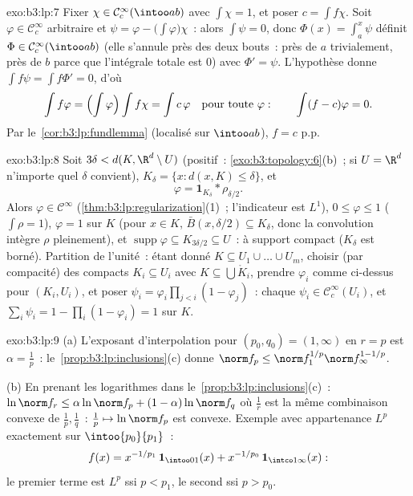 \begin{solution}{exo:b3:lp:7}
Fixer $\chi \in \mathcal C_c^\infty(\intoo ab)$ avec
$\int\chi = 1$, et poser $c = \int f\chi$. Soit $\varphi \in
\mathcal C_c^\infty$ arbitraire et $\psi = \varphi -
\bigl(\int\varphi\bigr)\chi$~: alors $\int\psi = 0$, donc
$\Phi(x) = \int_a^x\psi$ définit $\Phi \in \mathcal
C_c^\infty(\intoo ab)$ (elle s'annule près des deux bouts~:
près de $a$ trivialement, près de $b$ parce que l'intégrale
totale est $0$) avec $\Phi' = \psi$. L'hypothèse donne
$\int f\psi = \int f\Phi' = 0$, d'où
\[
\int f\varphi = \Bigl(\int\varphi\Bigr)\int f\chi = \int
c\,\varphi
\quad\text{pour toute } \varphi :
\qquad \int(f - c)\varphi = 0 .
\]
Par le~\cref{cor:b3:lp:fundlemma} (localisé sur $\intoo ab$),
$f = c$ p.p.
\end{solution}

\begin{solution}{exo:b3:lp:8}
Soit $3\delta < d(K, \R^d\setminus U)$ (positif~:
\cref{exo:b3:topology:6}(b)~; si $U = \R^d$ n'importe quel
$\delta$ convient), $K_\delta = \{x : d(x, K) \leq
\delta\}$, et
\[
\varphi = \mathbf 1_{K_\delta} * \rho_{\delta/2} .
\]
Alors $\varphi \in \mathcal C^\infty$
(\cref{thm:b3:lp:regularization}(1)~; l'indicateur est
$L^1$), $0 \leq \varphi \leq 1$ ($\int\rho = 1$), $\varphi =
1$ sur $K$ (pour $x \in K$, $\bar B(x, \delta/2) \subseteq
K_\delta$, donc la convolution intègre $\rho$ pleinement), et
$\operatorname{supp}\varphi \subseteq K_{3\delta/2} \subseteq
U$~: à support compact ($K_\delta$ est borné). Partition de
l'unité~: étant donné $K \subseteq U_1\cup\dots\cup U_m$,
choisir (par compacité) des compacts $K_i \subseteq U_i$ avec
$K \subseteq \bigcup \mathring K_i$, prendre $\varphi_i$
comme ci-dessus pour $(K_i, U_i)$, et poser $\psi_i =
\varphi_i\prod_{j <i}(1 - \varphi_j)$~: chaque $\psi_i \in
\mathcal C_c^\infty(U_i)$, et $\sum_i\psi_i = 1 -
\prod_i(1 - \varphi_i) = 1$ sur $K$.
\end{solution}

\begin{solution}{exo:b3:lp:9}
(a) L'exposant d'interpolation pour $(p_0, q_0) = (1,
\infty)$ en $r = p$ est $\alpha = \frac1p$~:
le~\cref{prop:b3:lp:inclusions}(c) donne $\norm f_p \leq
\norm f_1^{1/p}\norm f_\infty^{1 - 1/p}$.

(b) En prenant les logarithmes dans
le~\cref{prop:b3:lp:inclusions}(c)~: $\ln\norm f_r \leq
\alpha\ln\norm f_p + (1-\alpha)\ln\norm f_q$ où $\frac1r$
est la même combinaison convexe de $\frac1p, \frac1q$~:
$\frac1p \mapsto \ln\norm f_p$ est convexe. Exemple avec
appartenance $L^p$ exactement sur $\intoo{p_0}{p_1}$~:
\[
f(x) = x^{-1/p_1}\,\mathbf 1_{\intoo01}(x) +
x^{-1/p_0}\,\mathbf 1_{\intco1\infty}(x):
\]
le premier terme est $L^p$ ssi $p < p_1$, le second ssi $p >
p_0$.
\end{solution}

